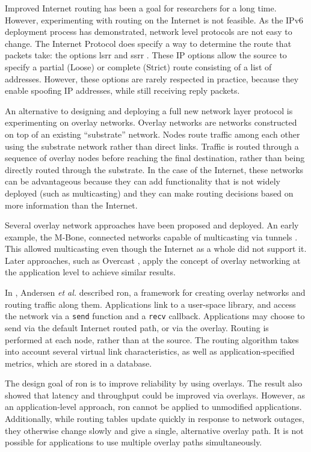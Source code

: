 \documentclass{cwru}
\begin{document}
Improved Internet routing has been a goal for researchers for a long time.
However, experimenting with routing on the Internet is not feasible. As the IPv6
deployment process has demonstrated, network level protocols are not easy to
change. The Internet Protocol does specify a way to determine the route that
packets take: the options \ac{lsrr} and \ac{ssrr} \cite{rfc791}. These IP
options allow the source to specify a partial (Loose) or complete (Strict) route
consisting of a list of addresses. However, these options are rarely respected
in practice, because they enable spoofing IP addresses, while still receiving
reply packets.

An alternative to designing and deploying a full new network layer protocol is
experimenting on overlay networks. Overlay networks are networks constructed on
top of an existing ``substrate'' network. Nodes route traffic among each other
using the substrate network rather than direct links. Traffic is routed through
a sequence of overlay nodes before reaching the final destination, rather than
being directly routed through the substrate. In the case of the Internet, these
networks can be advantageous because they can add functionality that is not
widely deployed (such as multicasting) and they can make routing decisions based
on more information than the Internet.

Several overlay network approaches have been proposed and deployed. An early
example, the M-Bone, connected networks capable of multicasting via tunnels
\cite{mbone}. This allowed multicasting even though the Internet as a whole did
not support it. Later approaches, such as Overcast \cite{jannotti2000overcast},
apply the concept of overlay networking at the application level to achieve
similar results.

In \cite{ron}, Andersen \textit{et al.} described \ac{ron}, a framework for
creating overlay networks and routing traffic along them. Applications link to a
user-space library, and access the network via a \texttt{send} function and a
\texttt{recv} callback. Applications may choose to send via the default Internet
routed path, or via the overlay. Routing is performed at each node, rather than
at the source. The routing algorithm takes into account several virtual link
characteristics, as well as application-specified metrics, which are stored in a
database.

The design goal of \ac{ron} is to improve reliability by using overlays. The
result also showed that latency and throughput could be improved via overlays.
However, as an application-level approach, \ac{ron} cannot be applied to
unmodified applications. Additionally, while routing tables update quickly in
response to network outages, they otherwise change slowly and give a single,
alternative overlay path. It is not possible for applications to use multiple
overlay paths simultaneously.
\end{document}
